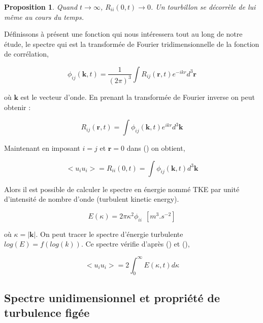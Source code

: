 \documentclass[12pt]{article}   %
\theoremstyle{plain}
\newtheorem{proposition}[theorem]{Proposition}
\theoremstyle{remark}
\begin{document}
		\begin{proposition}
			Quand $t\rightarrow\infty$, $R_{ii}(0,t)\rightarrow0$. Un tourbillon se décorrèle de lui même au cours du temps.
		\end{proposition}
	
		Définissons à présent une fonction qui nous intéressera tout au long de notre étude, le spectre qui est la transformée de Fourier tridimensionnelle de la fonction de corrélation,
		
		\begin{equation}
			\phi_{ij}(\textbf{k}, t) = \frac{1}{(2\pi)^3}\int R_{ij}(\textbf{r},t)e^{-ikr}d^3\textbf{r}
		\end{equation}
	 
	
		où $\textbf{k}$ est le vecteur d'onde. En prenant la transformée de Fourier inverse on peut obtenir :
		
		\begin{equation}
			R_{ij}(\textbf{r}, t) = \int \phi_{ij}(\textbf{k},t)e^{ikr}d^3\textbf{k}
			\label{spectra_space}
		\end{equation}
		
		Maintenant en imposant $i=j$ et $\textbf{r}=0$ dans () on obtient, 
		
		\begin{equation}
			<u_iu_i>=R_{ii}(0,t)=\int \phi_{ij}(\textbf{k},t)d^3\textbf{k}
			\label{verif}
		\end{equation}
	
		Alors il est possible de calculer le spectre en énergie nommé TKE par unité d'intensité de nombre d'onde (turbulent kinetic energy). 
		
		\begin{equation}
			E(\kappa)=2\pi \kappa^2\phi_{ii}~~[m^{3}.s^{-2}]
			\label{energie_spectra}
		\end{equation}
	
		où $\kappa = |\textbf{k}|$. On peut tracer le spectre d'énergie turbulente $log(E)=f(log(k))$. Ce spectre vérifie d'après () et (),
		
		\begin{equation}
			<u_iu_i>=2\int_{0}^{\infty}E(\kappa,t)d\kappa
		\end{equation}
	
	\subsection{Spectre unidimensionnel et propriété de turbulence figée}
	
\end{document}
